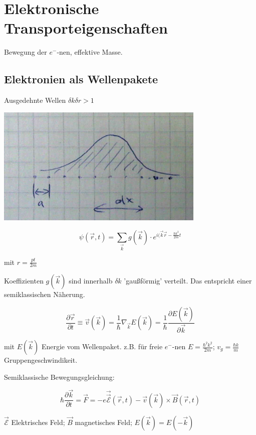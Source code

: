 

\setcounter{chapter}{9}
\chapter{Elektronische Transporteigenschaften}

Bewegung der \(e^-\)-nen, effektive Masse.

\section{Elektronien als Wellenpakete}

Ausgedehnte Wellen \(\delta k\delta r > 1\)

\includegraphics[width=0.75\textwidth]{kap10_01.png}

\[\psi(\vec r,t) = \sum_{\vec k} g(\vec k)\cdot e^{i(\vec k\vec r - \frac{\hbar k^2}{2m}t}\]

mit \(r= \frac{pt}{2m}\)

Koeffizienten \(g(\vec k)\) sind innerhalb \(\delta k\) 'gaußförmig' verteilt. Das entspricht einer semiklassischen Näherung. 

\[\frac{\partial \vec r}{\partial t} \equiv \vec v(\vec k) = \frac{1}{\hbar}\nabla_{\vec k}E(\vec k) = \frac{1}{\hbar} \frac{\partial E(\vec k)}{\partial \vec k} \]

mit \(E(\vec k) \) Energie vom Wellenpaket. z.B. für freie \(e^-\)-nen \(E=\frac{\hbar^2 k^2}{2m}\); \(v_g=\frac{\hbar k}{m}\) Gruppengeschwindikeit.

Semiklassische Bewegungsgleichung:

\[\hbar \frac{\partial \vec k}{\partial t}=\vec F = -e\vec \vec{ \mathcal E}(\vec r,t) -\vec v(\vec k)\times \vec B(\vec r,t)  \]

\(\vec{ \mathcal E}\) Elektrisches Feld; \(\vec B\) magnetisches Feld; \(E(\vec k) = E(-\vec k)\)

